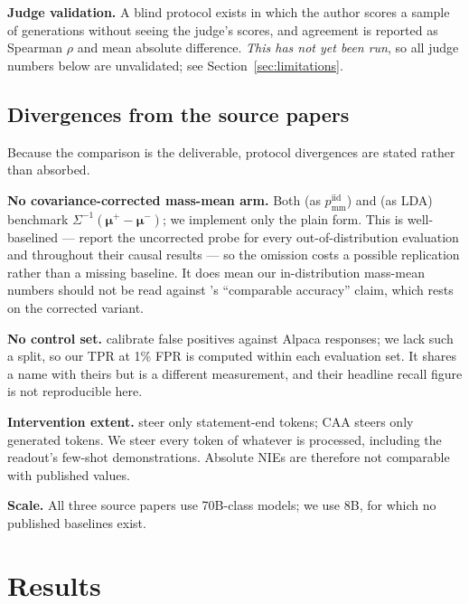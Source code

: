 \documentclass[conference]{IEEEtran}
\begin{document}
\textbf{Judge validation.} A blind protocol exists in which the author scores a
sample of generations without seeing the judge's scores, and agreement is
reported as Spearman $\rho$ and mean absolute difference. \emph{This has not yet
been run}, so all judge numbers below are unvalidated; see
Section~\ref{sec:limitations}.

\subsection{Divergences from the source papers}
\label{sec:divergences}

Because the comparison is the deliverable, protocol divergences are stated
rather than absorbed.

\textbf{No covariance-corrected mass-mean arm.} Both \citet{marks2024} (as
$p^{\text{iid}}_{\text{mm}}$) and \citet{goldowsky2025} (as LDA) benchmark
$\Sigma^{-1}(\boldsymbol{\mu}^{+}-\boldsymbol{\mu}^{-})$; we implement only the
plain form. This is well-baselined --- \citeauthor{marks2024} report the
uncorrected probe for every out-of-distribution evaluation and throughout their
causal results --- so the omission costs a possible replication rather than a
missing baseline. It does mean our in-distribution mass-mean numbers should not
be read against \citeauthor{marks2024}'s ``comparable accuracy'' claim, which
rests on the corrected variant.

\textbf{No control set.} \citeauthor{goldowsky2025} calibrate false positives
against Alpaca responses; we lack such a split, so our TPR at 1\% FPR is
computed within each evaluation set. It shares a name with theirs but is a
different measurement, and their headline recall figure is not reproducible
here.

\textbf{Intervention extent.} \citeauthor{marks2024} steer only statement-end
tokens; CAA steers only generated tokens. We steer every token of whatever is
processed, including the readout's few-shot demonstrations. Absolute NIEs are
therefore not comparable with published values.

\textbf{Scale.} All three source papers use 70B-class models; we use 8B, for
which no published baselines exist.

\section{Results}
\label{sec:results}
\end{document}
